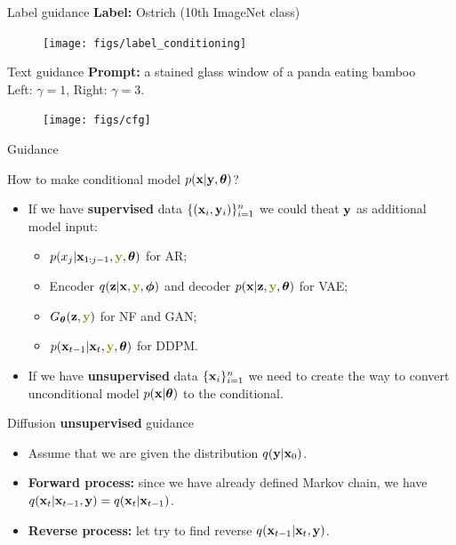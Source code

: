 \begin{frame}{Label guidance}
	\textbf{Label:} Ostrich (10th ImageNet class) 
	\begin{figure}
		\texttt{[image: figs/label\_conditioning]}
	\end{figure}
	\end{frame}
\begin{frame}{Text guidance}
	\textbf{Prompt:} a stained glass window of a panda eating bamboo \\
	Left: $\gamma = 1$, Right: $\gamma = 3$.
	\begin{figure}
		\texttt{[image: figs/cfg]}
	\end{figure}
\end{frame}
\begin{frame}{Guidance}
	\begin{block}{How to make conditional model $p(\mathbf{x} | \mathbf{y}, \boldsymbol{\theta})$?}
		\begin{itemize}
		\item If we have \textbf{supervised} data $\{(\mathbf{x}_i, \mathbf{y}_i)\}_{i=1}^n$ we could theat $\mathbf{y}$ as additional model input:
		\begin{itemize}
			\item $p(x_j | \bx_{1:j-1}, {\color{olive}\by}, \btheta)$ for AR;
			\item Encoder $q(\bz | \bx, {\color{olive}\by}, \bphi)$ and decoder $p(\bx | \bz, {\color{olive}\by}, \btheta)$ for VAE;
			\item $G_{\btheta}(\bz, {\color{olive}\by})$ for NF and GAN;
			\item $p(\bx_{t-1} | \bx_t, {\color{olive}\by}, \btheta)$ for DDPM.
		\end{itemize}
		\item If we have \textbf{unsupervised} data $\{\mathbf{x}_i\}_{i=1}^n$ we need to create the way to convert unconditional model $p(\mathbf{x} | \boldsymbol{\theta})$ to the conditional.
		\end{itemize}
	\end{block}
	\begin{block}{Diffusion \textbf{unsupervised} guidance}
		\begin{itemize}
			\item Assume that we are given the distribution $q(\mathbf{y} | \mathbf{x}_0)$. 
			\item \textbf{Forward process:} since we have already defined Markov chain, we have $q(\mathbf{x}_t | \mathbf{x}_{t-1}, \mathbf{y}) = q(\mathbf{x}_t | \mathbf{x}_{t - 1})$.
			\item \textbf{Reverse process:} let try to find reverse $q(\mathbf{x}_{t-1} | \mathbf{x}_t, \mathbf{y})$.
		\end{itemize}
	\end{block}
\end{frame}
